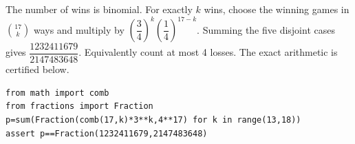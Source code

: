 The number of wins is binomial. For exactly $k$ wins, choose the winning games in $\binom{17}{k}$ ways and multiply by $(\dfrac{3}{4})^k(\dfrac{1}{4})^{17-k}$. Summing the five disjoint cases gives $\boxed{\dfrac{1232411679}{2147483648}}$. Equivalently count at most 4 losses. The exact arithmetic is certified below.
\begin{verbatim}
from math import comb
from fractions import Fraction
p=sum(Fraction(comb(17,k)*3**k,4**17) for k in range(13,18))
assert p==Fraction(1232411679,2147483648)
\end{verbatim}
